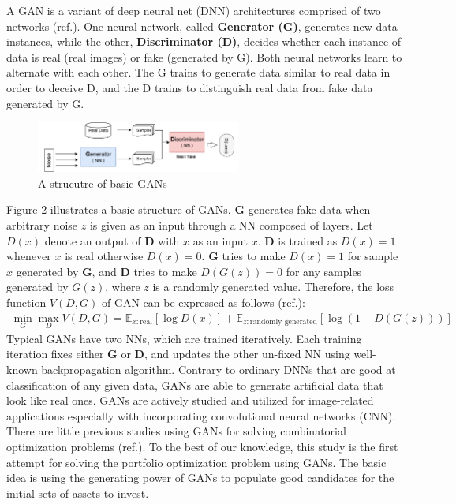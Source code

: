 \documentclass[11pt]{article}
\begin{document}
	A GAN is a variant of deep neural net (DNN) architectures comprised of two networks (ref.). One neural network, called \textbf{Generator (G)}, generates new data instances, while the other, \textbf{Discriminator (D)}, decides whether each instance of data is real (real images) or fake (generated by G). Both neural networks learn to alternate with each other. The G trains to generate data similar to real data in order to deceive D, and the D trains to distinguish real data from fake data generated by G. 
	\begin{figure}[h] 
		\begin{center}
			\includegraphics[width=0.6\textwidth]{GAN_basic}
			\caption{A strucutre of basic GANs} \label{fig:GAN-basic}
		\end{center}
	\end{figure}
	Figure 2 illustrates a basic structure of GANs. \textbf{G} generates fake data when arbitrary noise $z$ is given as an input through a NN composed of layers. Let $D(x)$ denote an output of \textbf{D} with $x$ as an input $x$. \textbf{D} is trained as $D(x)=1$ whenever $x$ is real otherwise $D(x)=0$. \textbf{G} tries to make $D(x) = 1$ for sample $x$ generated by \textbf{G}, and \textbf{D} tries to make $D(G(z)) = 0$ for any samples generated by $G(z)$, where $z$ is a randomly generated value. Therefore, the loss function $V(D,G)$ of GAN can be expressed as follows (ref.):
	\begin{align*}
	\min_G \max_D V(D,G)  = \mathbb{E}_{x:\text{real}}\left[\log D(x) \right]  + \mathbb{E}_{z:\text{randomly generated}} \left[\log(1-D(G(z))) \right] 
	\end{align*}
	Typical GANs have two NNs, which are trained iteratively. Each training iteration fixes either \textbf{G} or \textbf{D}, and updates the other un-fixed NN using well-known backpropagation algorithm. Contrary to ordinary DNNs that are good at classification of any given data, GANs are able to generate artificial data that look like real ones. GANs are actively studied and utilized for image-related applications especially with incorporating convolutional neural networks (CNN). There are little previous studies using GANs for solving combinatorial optimization problems (ref.). To the best of our knowledge, this study is the first attempt for solving the portfolio optimization problem using GANs. The basic idea is using the generating power of GANs to populate good candidates for the initial sets of assets to invest.
	
\end{document}
